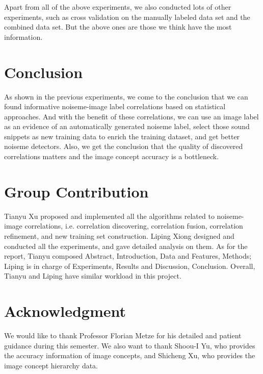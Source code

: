 \documentclass[conference, 11pt, onecolumn]{IEEEtran}
\begin{document}
Apart from all of the above experiments, we also conducted lots of other experiments, such as cross validation on the manually labeled data set and  the combined data set. But the above ones are those we think have the most information.

\section{Conclusion}
As shown in the previous experiments, we come to the conclusion that we can found informative noiseme-image label correlations based on statistical approaches. And with the benefit of these correlations, we can use an image label as an evidence of an automatically generated noiseme label, select those sound snippets as new training data to enrich the training dataset, and get better noiseme detectors. Also, we get the conclusion that the quality of discovered correlations matters and the image concept accuracy is a bottleneck.

\section{Group Contribution}
Tianyu Xu proposed and implemented all the algorithms related to noiseme-image correlations, i.e. correlation discovering, correlation fusion, correlation refinement, and new training set construction. Liping Xiong designed and conducted all the experiments, and gave detailed analysis on them. As for the report, Tianyu composed Abstract, Introduction, Data and Features, Methods; Liping is in charge of Experiments, Results and Discussion, Conclusion. Overall, Tianyu and Liping have similar workload in this project.

\section*{Acknowledgment}
We would like to thank Professor Florian Metze for his detailed and patient guidance during this semester. We also want to thank Shoou-I Yu, who provides the accuracy information of image concepts, and Shicheng Xu, who provides the image concept hierarchy data.



\end{document}
